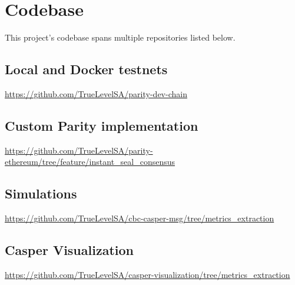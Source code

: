\chapter{Codebase}
\label{chap:codebase}

This project's codebase spans multiple repositories listed below.

\section{Local and Docker testnets}
\url{https://github.com/TrueLevelSA/parity-dev-chain}

\section{Custom Parity implementation}
\url{https://github.com/TrueLevelSA/parity-ethereum/tree/feature/instant_seal_consensus}

\section{Simulations}
\url{https://github.com/TrueLevelSA/cbc-casper-msg/tree/metrics_extraction}

\section{Casper Visualization}
\url{https://github.com/TrueLevelSA/casper-visualization/tree/metrics_extraction}
